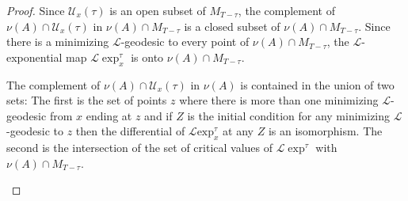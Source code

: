 \begin{proof}
Since ${\mathcal U}_x(\tau)$ is an open subset of $M_{T-\tau}$, the complement
of $\nu(A)\cap{\mathcal U}_x(\tau)$ in $\nu(A)\cap M_{T-\tau}$ is a closed
subset of $\nu(A)\cap M_{T-\tau}$. Since there is a minimizing ${\mathcal
L}$-geodesic to every point of $\nu(A)\cap M_{T-\tau}$, the ${\mathcal
L}$-exponential map ${\mathcal L}\exp^\tau_x$ is onto $\nu(A)\cap
M_{T-\tau}$.

\begin{claim}\label{claim:complement-injectivity-set-two-types}
\label{twosets}
The complement of $\nu(A)\cap {\mathcal U}_{x}(\tau)$
in $\nu(A)$ is contained in the union of two sets: The first is the set of
points $z$ where there is more than one minimizing ${\mathcal L}$-geodesic from
$x$ ending at $z$ and if $Z$ is the initial condition for any minimizing
${\mathcal L}$-geodesic to $z$ then the differential of ${\mathcal L}\mathrm{exp}_x^\tau$ at any $Z$ is an isomorphism. The second is the intersection of
the set of critical values of ${\mathcal L}\exp^\tau$ with $\nu(A)\cap
M_{T-\tau}$.
\end{claim}


\end{proof}
